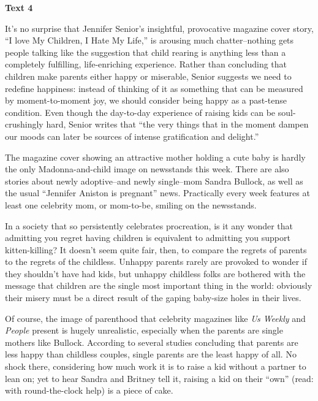 
\begin{center}\textbf{Text 4}\end{center}

\qquad It's no surprise that Jennifer Senior's insightful, provocative magazine cover story, ``I love My Children, I Hate My Life,'' is arousing much chatter--nothing gets people talking like the suggestion that child rearing is anything less than a completely fulfilling, life-enriching experience. Rather than concluding that children make parents either happy or miserable, Senior suggests we need to redefine happiness: instead of thinking of it as something that can be measured by moment-to-moment joy, we should consider being happy as a past-tense condition. Even though the day-to-day experience of raising kids can be soul-crushingly hard, Senior writes that ``the very things that in the moment dampen our moods can later be sources of intense gratification and delight.''

\qquad The magazine cover showing an attractive mother holding a cute baby is hardly the only Madonna-and-child image on newsstands this week. There are also stories about newly adoptive--and newly single--mom Sandra Bullock, as well as the usual ``Jennifer Aniston is pregnant'' news. Practically every week features at least one celebrity mom, or mom-to-be, smiling on the newsstands.

\qquad In a society that so persistently celebrates procreation, is it any wonder that admitting you regret having children is equivalent to admitting you support kitten-killing? It doesn't seem quite fair, then, to compare the regrets of parents to the regrets of the childless. Unhappy parents rarely are provoked to wonder if they shouldn't have had kids, but unhappy childless folks are bothered with the message that children are the single most important thing in the world: obviously their misery must be a direct result of the gaping baby-size holes in their lives. 

\qquad Of course, the image of parenthood that celebrity magazines like \emph{Us Weekly} and \emph{People} present is hugely unrealistic, especially when the parents are single mothers like Bullock. According to several studies concluding that parents are less happy than childless couples, single parents are the least happy of all. No shock there, considering how much work it is to raise a kid without a partner to lean on; yet to hear Sandra and Britney tell it, raising a kid on their ``own'' (read: with round-the-clock help) is a piece of cake.

